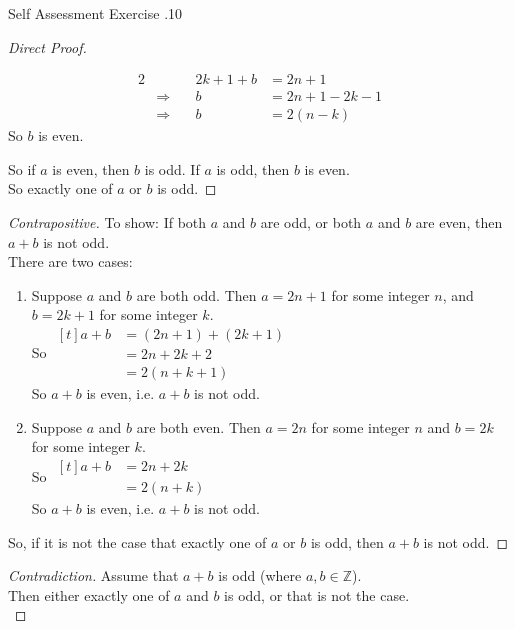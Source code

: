 \documentclass[\main/notes.tex]{subfiles}
\begin{document}
\begin{exercise}{Self Assessment Exercise \thechapter.10}
\begin{enumerate}
\begin{enumerate}[label=(\alph*)]
\begin{proof}[Direct Proof]
\begin{enumerate}[label=(\roman*)]
\begin{alignat*}{2}
													& & 2k + 1 + b &= 2n + 1\\
													& \Rightarrow \quad &b &= 2n + 1 - 2k - 1\\
													& \Rightarrow \quad &b &= 2(n - k)
												\end{alignat*}
												So $b$ is even.
										\end{enumerate}
										So if $a$ is even, then $b$ is odd. If $a$ is odd, then $b$ is even.\\
										So exactly one of $a$ or $b$ is odd.
									\end{proof}
									\begin{proof}[Contrapositive]
										To show: If both $a$ and $b$ are odd, or both $a$ and $b$ are even, then $a + b$ is not odd.\\
										There are two cases:
										\begin{enumerate}[label=(\roman*)]
											\item Suppose $a$ and $b$ are both odd. Then $a = 2n + 1$ for some integer $n$, and $b = 2k + 1$ for some integer $k$.\\
												So $ \begin{aligned}[t]
													a + b &= (2n + 1) + (2k + 1)\\
													&= 2n + 2k + 2\\
													&= 2(n + k + 1)
												\end{aligned}$\\
												So $a + b$ is even, i.e. $a + b$ is not odd.
											\item Suppose $a$ and $b$ are both even. Then $a = 2n$ for some integer $n$ and $b = 2k$ for some integer $k$.\\
												So $ \begin{aligned}[t]
													a + b &= 2n + 2k\\
													&= 2(n + k)
												\end{aligned}$\\
												So $a + b$ is even, i.e. $a + b$ is not odd.
										\end{enumerate}
										So, if it is not the case that exactly one of $a$ or $b$ is odd, then $a + b$ is not odd.
									\end{proof}
									\pagebreak
									\begin{proof}[Contradiction]
										Assume that $a + b$ is odd (where $a, b \in \mathbb{Z}$).\\
										Then either exactly one of $a$ and $b$ is odd, or that is not the case.\\

\end{proof}
\end{enumerate}
\end{enumerate}
\end{exercise}
\end{document}

